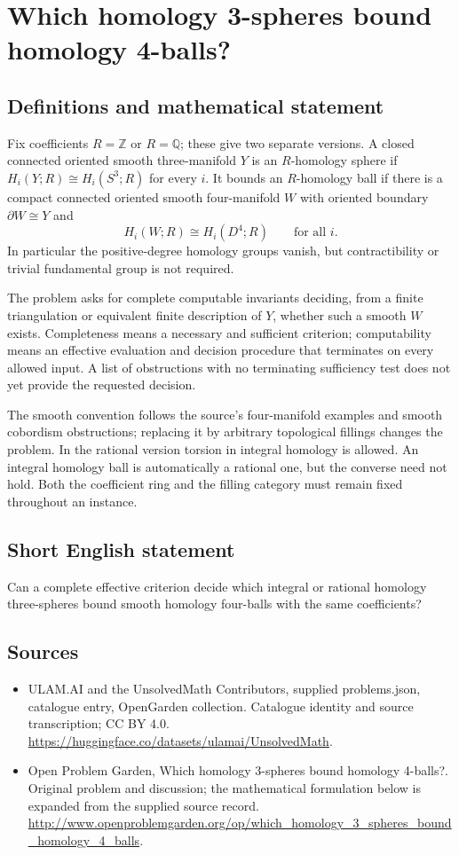 \documentclass[11pt,a4paper]{article}
\begin{document}
\section*{Which homology 3-spheres bound homology 4-balls?}\label{statement}

\subsection{Definitions and mathematical statement}
Fix coefficients $R=\mathbb Z$ or $R=\mathbb Q$; these give two
separate versions. A closed connected oriented smooth three-manifold
$Y$ is an $R$-homology sphere if
$H_i(Y;R)\cong H_i(S^3;R)$ for every $i$. It bounds an
$R$-homology ball if there is a compact connected oriented smooth
four-manifold $W$ with oriented boundary $\partial W\cong Y$ and
\[
               H_i(W;R)\cong H_i(D^4;R)\qquad\text{for all }i.
\]
In particular the positive-degree homology groups vanish, but
contractibility or trivial fundamental group is not required.

The problem asks for complete computable invariants deciding, from
a finite triangulation or equivalent finite description of $Y$,
whether such a smooth $W$ exists. Completeness means a necessary
and sufficient criterion; computability means an effective evaluation
and decision procedure that terminates on every allowed input.
A list of obstructions with no terminating sufficiency test does
not yet provide the requested decision.

The smooth convention follows the source's four-manifold examples
and smooth cobordism obstructions; replacing it by arbitrary
topological fillings changes the problem. In the rational version
torsion in integral homology is allowed. An integral homology ball
is automatically a rational one, but the converse need not hold.
Both the coefficient ring and the filling category must remain fixed
throughout an instance.
\subsection{Short English statement}
Can a complete effective criterion decide which integral or rational homology three-spheres bound smooth homology four-balls with the same coefficients?
\subsection{Sources}
\begin{itemize}
\item[S1] ULAM.AI and the UnsolvedMath Contributors, supplied problems.json, catalogue entry, OpenGarden collection. Catalogue identity and source transcription; CC BY 4.0.
\url{https://huggingface.co/datasets/ulamai/UnsolvedMath}.
\item[S2] Open Problem Garden, Which homology 3-spheres bound homology 4-balls?. Original problem and discussion; the mathematical formulation below is expanded from the supplied source record.
\url{http://www.openproblemgarden.org/op/which_homology_3_spheres_bound_homology_4_balls}.
\end{itemize}
\end{document}
